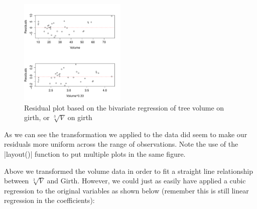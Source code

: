 %
%
\begin{figure}[htbp]
\centering
\includegraphics[height=2in]{./figures/hands-on4/compare-residuals.pdf}
\caption{Residual plot based on the bivariate regression of tree volume on girth, or $\sqrt[3]{V}$ on girth \label{fig:compare-resid}}
\end{figure}
%
As we can see the transformation we applied to the data did seem to make our residuals more uniform across the range of observations. Note the use of the |layout()| function to put multiple plots in the same figure.

Above we transformed the volume data in order to fit a straight line relationship between $$  and Girth. However, we could just as easily have applied a cubic regression to the original variables as shown below (remember this is still linear regression in the coefficients):

